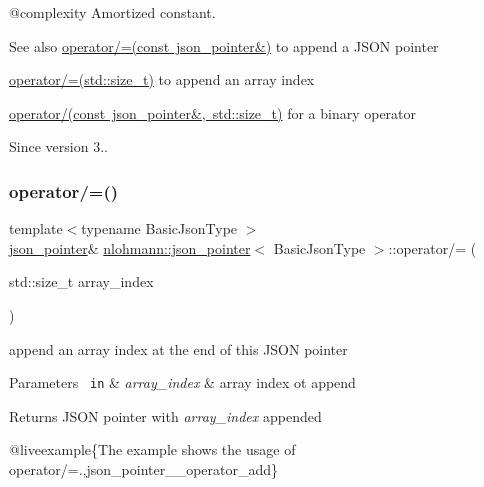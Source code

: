 @complexity Amortized constant.

\begin{DoxySeeAlso}{See also}
\mbox{\hyperlink{classnlohmann_1_1json__pointer_a7395bd0af29ac23fd3f21543c935cdfa}{operator/=(const json\+\_\+pointer\&)}} to append a J\+S\+ON pointer 

\mbox{\hyperlink{classnlohmann_1_1json__pointer_a64c8401529131bad1e486d91d703795f}{operator/=(std\+::size\+\_\+t)}} to append an array index 

\mbox{\hyperlink{classnlohmann_1_1json__pointer_a9f6bc6f4d4668b4e9a19d8b8ac29da4f}{operator/(const json\+\_\+pointer\&, std\+::size\+\_\+t)}} for a binary operator
\end{DoxySeeAlso}
\begin{DoxySince}{Since}
version 3.. 
\end{DoxySince}
\mbox{\label{classnlohmann_1_1json__pointer_a64c8401529131bad1e486d91d703795f}} 
\subsubsection{\texorpdfstring{operator/=()}{operator/=()}\hspace{0.1cm}{\footnotesize\ttfamily [3/3]}}
{\footnotesize\ttfamily template$<$typename Basic\+Json\+Type $>$ \\
\mbox{\hyperlink{classnlohmann_1_1json__pointer}{json\+\_\+pointer}}\& \mbox{\hyperlink{classnlohmann_1_1json__pointer}{nlohmann\+::json\+\_\+pointer}}$<$ Basic\+Json\+Type $>$\+::operator/= (\begin{DoxyParamCaption}\item[{std\+::size\+\_\+t}]{array\+\_\+index }\end{DoxyParamCaption})\hspace{0.3cm}{\ttfamily [inline]}}



append an array index at the end of this J\+S\+ON pointer 


\begin{DoxyParams}[1]{Parameters}
\mbox{\texttt{ in}}  & {\em array\+\_\+index} & array index ot append \\
\hline
\end{DoxyParams}
\begin{DoxyReturn}{Returns}
J\+S\+ON pointer with {\itshape array\+\_\+index} appended
\end{DoxyReturn}
@liveexample\{The example shows the usage of {\ttfamily operator/=}.,json\+\_\+pointer\+\_\+\+\_\+operator\+\_\+add\}

